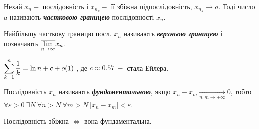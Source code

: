 \begin{definition} 
       Нехай $x_n -$ послідовність і $x_{n_k} -$ її збіжна підпослідовність, $x_{n_k} \to a$. Тоді число $a$ називають \textcolor{NavyBlue}{\textbf{\textit{{частковою границею}}}} послідовності $x_n$.
\end{definition}

\begin{definition}
       Найбільшу часткову границю посл. $x_n$ називають \textcolor{NavyBlue}{\textbf{\textit{{верхньою границею}}}} і позначають {$\overline{\displaystyle\lim\limits_{n \to \infty}} x_n $.}
\end{definition}

\begin{theorem}
         $\displaystyle\sum\limits_{k=1}^n \dfrac{1}{k} = \ln{n} + c + o(1) \;$, де $c \approx 0.57 \: -  $ стала Ейлера. 
\end{theorem}

\begin{definition}
         Послідовність $x_n$ називають \textcolor{NavyBlue}{\textbf{\textit{{фундаментальною}}}}, якщо $x_n - x_m \xrightarrow[n, m \to +\infty]{}0$, тобто \newline $\forall \varepsilon > 0 \ \exists N \  \forall n > N \ \forall m > N \ |x_n - x_m| < \varepsilon$.
\end{definition}

\begin{theorem}
         Послідовність збіжна $\iff $ вона фундаментальна.
\end{theorem}
